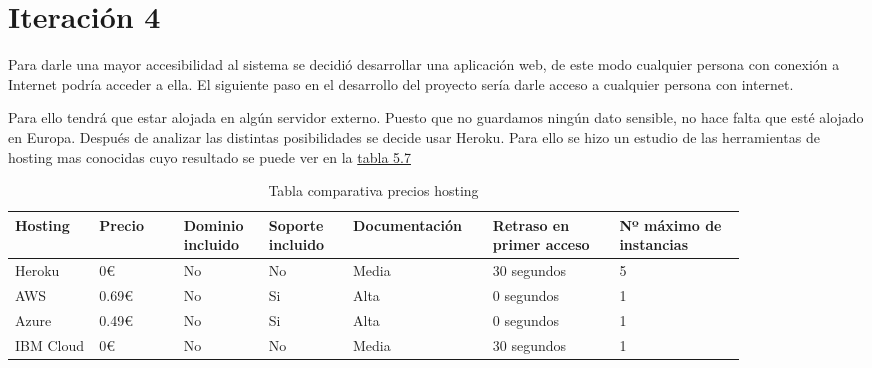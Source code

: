 \section{Iteración 4}

Para darle una mayor accesibilidad al sistema se decidió desarrollar
una aplicación web, de este modo cualquier persona con conexión a
Internet podría acceder a ella. El siguiente paso en el desarrollo
del proyecto sería darle acceso a cualquier persona con internet.

Para ello tendrá que estar alojada en algún servidor externo.
Puesto que no guardamos ningún dato sensible, no hace falta
que esté alojado en Europa. Después de analizar las distintas posibilidades
se decide usar Heroku. Para ello se hizo un estudio de las herramientas
de hosting mas conocidas cuyo resultado se puede ver en la \hyperref[tab:Tabla comparativa precios hosting]{tabla 5.7}

\begin{longtable}{|p{0.1\linewidth}p{0.1\linewidth}p{0.1\linewidth}p{0.1\linewidth}p{0.15\linewidth}p{0.15\linewidth}p{0.15\linewidth}|}
  \caption{Tabla comparativa precios hosting}
  \label{tab:Tabla comparativa precios hosting}
  \endfirsthead
  \endhead
  \hline
  \multicolumn{1}{|l}{Hosting} & Precio & Dominio incluido & Soporte incluido & Documentación & Retraso en primer acceso & Nº máximo de instancias \\ \hline
  Heroku & 0€ & No & No & Media & 30 segundos & 5 \\ \hline
  AWS & 0.69€ & No & Si & Alta & 0 segundos & 1 \\ \hline
  Azure & 0.49€ & No & Si & Alta & 0 segundos & 1 \\ \hline
  IBM Cloud & 0€ & No & No & Media & 30 segundos & 1 \\ \hline
\end{longtable}

